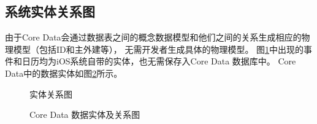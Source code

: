 \subsection{系统实体关系图}
由于Core Data会通过数据表之间的概念数据模型和他们之间的关系生成相应的物理模型（包括ID和主外建等），
无需开发者生成具体的物理模型。
图\ref{fig:e-r}中出现的事件和日历均为iOS系统自带的实体，也无需保存入Core Data 数据库中。
Core Data中的数据实体如图\ref{fig:core-data}所示。
\begin{figure}[!htbp]
	\centering
	\caption{实体关系图}
    \label{fig:e-r}
\end{figure}

\begin{figure}[!htbp]
	\centering
	\caption{Core Data 数据实体及关系图}
	\label{fig:core-data}
\end{figure}

